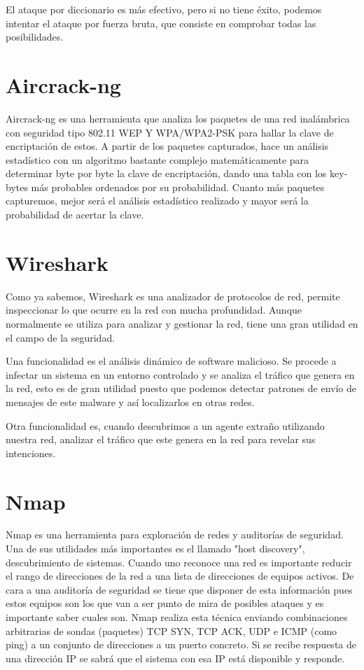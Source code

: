 \documentclass[a4paper, 11pt]{article}
\theoremstyle{plain}
\begin{document}
El ataque por diccionario es más efectivo, pero si no tiene éxito, podemos intentar el ataque por fuerza bruta, que consiste en comprobar todas las posibilidades.

\section{Aircrack-ng}

Aircrack-ng es una herramienta que analiza los paquetes de una red inalámbrica con seguridad tipo 802.11 WEP Y WPA/WPA2-PSK para hallar la clave de encriptación de estos. A partir de los paquetes capturados, hace un análisis estadístico con un algoritmo bastante complejo matemáticamente para determinar byte por byte la clave de encriptación, dando una tabla con los key-bytes más probables ordenados por su probabilidad. Cuanto más paquetes capturemos, mejor será el análisis estadístico realizado y mayor será la probabilidad de acertar la clave.

\section{Wireshark}

Como ya sabemos, Wireshark es una analizador de protocolos de red, permite inspeccionar lo que ocurre en la red con mucha profundidad. Aunque normalmente se utiliza para analizar y gestionar la red, tiene una gran utilidad en el campo de la seguridad. 

Una funcionalidad es el análisis dinámico de software malicioso. Se procede a infectar un sistema en un entorno controlado y se analiza el tráfico que genera en la red, esto es de gran utilidad puesto que podemos detectar patrones de envío de mensajes de este malware y así localizarlos en otras redes. 

Otra funcionalidad es, cuando descubrimos a un agente extraño utilizando nuestra red, analizar el tráfico que este genera en la red para revelar sus intenciones.

\section{Nmap}

Nmap es una herramienta para exploración de redes y auditorías de seguridad. Una 
de sus utilidades más importantes es el llamado "host discovery", descubrimiento de sistemas.
Cuando uno reconoce una red es importante reducir el rango de direcciones de la red 
a una lista de direcciones de equipos activos. De cara a una auditoría de seguridad 
se tiene que disponer de esta información pues estos equipos son los que van a ser
punto de mira de posibles ataques y es importante saber cuales son. Nmap realiza 
esta técnica enviando combinaciones arbitrarias de sondas (paquetes) TCP SYN, TCP ACK, UDP 
e ICMP (como ping) a un conjunto de direcciones a un puerto concreto. Si se recibe 
respuesta de una dirección IP se sabrá que el sistema con esa IP está disponible y responde.\\
\end{document}
